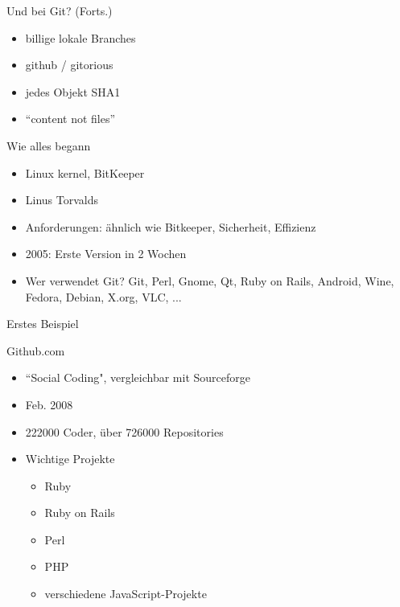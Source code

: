 \documentclass{beamer}
\begin{document}
\begin{frame}[<+->]{Und bei Git? (Forts.)}{}
  \begin{itemize}
    \item billige lokale Branches
    \item github / gitorious
    \item jedes Objekt SHA1
    \item ``content not files''
  \end{itemize}
\end{frame}

\begin{frame}[<+->]{Wie alles begann}{}
  \begin{itemize}
    \item Linux kernel, BitKeeper
    \item Linus Torvalds
    \item Anforderungen: ähnlich wie Bitkeeper, Sicherheit, Effizienz
    \item 2005: Erste Version in 2 Wochen
    \item Wer verwendet Git? Git, Perl, Gnome, Qt, Ruby on Rails, Android, Wine, Fedora, Debian, X.org, VLC, ...

  \end{itemize}
\end{frame}

\begin{frame}{Erstes Beispiel}

\end{frame}

\begin{frame}{Github.com}
\begin{itemize}
    \item ``Social Coding", vergleichbar mit Sourceforge
	\item Feb. 2008
	\item 222000 Coder, über 726000 Repositories
	\item Wichtige Projekte
	\begin{itemize}
	\item Ruby
	\item Ruby on Rails
	\item Perl
	\item PHP
	\item verschiedene JavaScript-Projekte
	\end{itemize}
  \end{itemize}
\end{frame}
\end{document}
